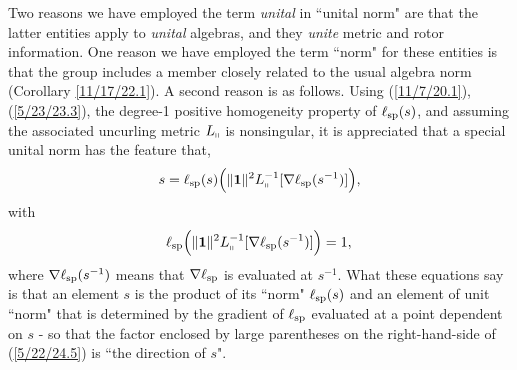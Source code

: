 \documentclass{amsart}
\numberwithin{equation}{section}
\theoremstyle{definition}
\numberwithin{theorem}{section}
\begin{document}
Two reasons we have employed the term {\it unital} in ``unital norm" are that the latter entities apply to {\it unital} algebras, and they {\it unite} metric and rotor information.  One reason we have employed the term ``norm" for these entities is that the group includes a member closely related to the usual algebra norm (Corollary \ref{11/17/22.1}).  A second reason is as follows.   Using (\ref{11/7/20.1}), (\ref{5/23/23.3}), the degree-1 positive homogeneity property of $\ell_{\rm sp}(s)$, and assuming the associated uncurling metric $L_{\shortparallel}$ is nonsingular, it is appreciated that a special unital norm has the feature that, 
\begin{equation}\label{5/22/24.5}  s = \ell_{\rm sp}(s)\Big(\|\mathbf{1}\|^2 L_{\shortparallel}^{-1}[\nabla\ell_{\rm sp}(s^{-1})]\Big),\end{equation} with
\begin{equation}\label{5/22/24.6}\ell_{\rm sp}\Big(\|\mathbf{1}\|^2 L_{\shortparallel}^{-1}[\nabla\ell_{\rm sp}(s^{-1})]\Big) = 1,\,\end{equation}
where $\nabla\ell_{\rm sp}(s^{-1})$ means that $\nabla\ell_{\rm sp}$ is evaluated at $s^{-1}$.  What these equations say is that an element $s$ is the product of its ``norm" $\ell_{\rm sp}(s)$ and an element of unit ``norm" that is determined by the gradient of $\ell_{\rm sp}$ evaluated at a point dependent on $s$ - so that the factor enclosed by large parentheses on the right-hand-side of (\ref{5/22/24.5}) is  ``the direction of $s$".  
\end{document}

